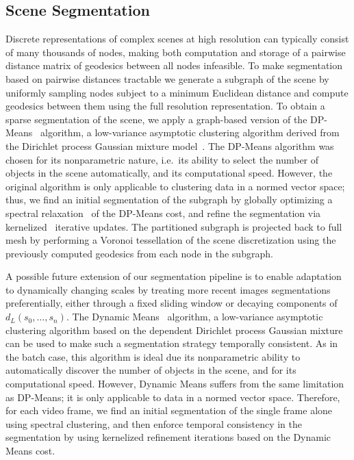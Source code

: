 \subsection{Scene Segmentation}\label{sec:segmentation}
Discrete
representations of complex scenes at high resolution can typically consist of many thousands of
nodes, making both computation and storage of a pairwise distance matrix of geodesics between all nodes infeasible. To make
segmentation based on pairwise distances tractable we generate a subgraph of the scene by
uniformly sampling nodes subject to a minimum Euclidean distance and compute geodesics
between them using the full resolution representation. To obtain a sparse segmentation of the scene, we apply a graph-based version of the
DP-Means~\cite{Kulis12_ICML} algorithm, a low-variance asymptotic clustering algorithm derived from
the Dirichlet process Gaussian mixture model~\cite{Teh10_EML}. The DP-Means algorithm was chosen for
its nonparametric nature, i.e.~its ability to select the number of objects in the scene
automatically, and its computational speed. However, the original algorithm is only applicable to
clustering data in a normed vector space; thus, we find an initial segmentation of the
subgraph by globally optimizing a spectral relaxation~\cite{Zha01_NIPS,Yu03_ICCV} of the DP-Means
cost, and refine the segmentation via kernelized~\cite{Dhillon07_TPAMI} iterative
updates. The partitioned subgraph is projected back to full mesh by performing a Voronoi
tessellation of the scene discretization using the previously computed geodesics from each node in the subgraph.

A possible future extension of our segmentation pipeline is to enable adaptation to dynamically changing scales by treating more recent images segmentations preferentially, either through a fixed sliding window or decaying components of  $d_L(s_0,\ldots,s_n)$. The Dynamic Means~\cite{Campbell13_NIPS} algorithm, a low-variance
asymptotic clustering algorithm based on the dependent Dirichlet process Gaussian
mixture~\cite{Lin10_NIPS} can be used to make such a segmentation strategy temporally consistent. As in the batch case, this algorithm is ideal due
its nonparametric ability to automatically discover the number of objects in the
scene, and for its computational speed. However, Dynamic Means suffers from the
same limitation as DP-Means; it is only applicable to data in a normed vector
space. Therefore, for each video frame, we find an initial segmentation of the
single frame alone using spectral clustering, and then enforce temporal consistency in the
segmentation by using kernelized refinement iterations based on the Dynamic Means cost.
